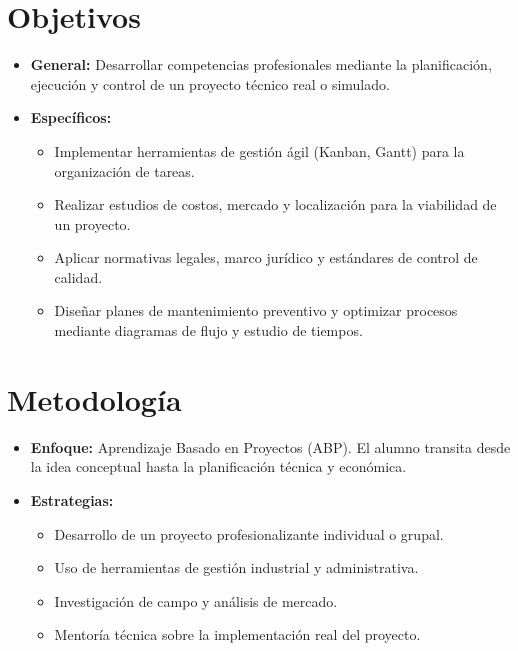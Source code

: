 \section*{Objetivos}
\begin{itemize}[label=\textbullet]
    \item \textbf{General:} Desarrollar competencias profesionales mediante la planificación, ejecución y control de un proyecto técnico real o simulado.
    \item \textbf{Específicos:}
    \begin{itemize}
        \item Implementar herramientas de gestión ágil (Kanban, Gantt) para la organización de tareas.
        \item Realizar estudios de costos, mercado y localización para la viabilidad de un proyecto.
        \item Aplicar normativas legales, marco jurídico y estándares de control de calidad.
        \item Diseñar planes de mantenimiento preventivo y optimizar procesos mediante diagramas de flujo y estudio de tiempos.
    \end{itemize}
\end{itemize}

\section*{Metodología}
\begin{itemize}[label=\textbullet]
    \item \textbf{Enfoque:} Aprendizaje Basado en Proyectos (ABP). El alumno transita desde la idea conceptual hasta la planificación técnica y económica.
    \item \textbf{Estrategias:}
    \begin{itemize}
        \item Desarrollo de un proyecto profesionalizante individual o grupal.
        \item Uso de herramientas de gestión industrial y administrativa.
        \item Investigación de campo y análisis de mercado.
        \item Mentoría técnica sobre la implementación real del proyecto.
    \end{itemize}
\end{itemize}

